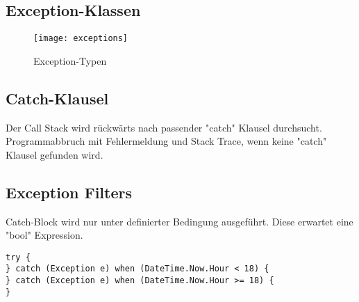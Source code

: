 \subsection{Exception-Klassen}
\begin{figure}[h!]
	\centering
	\texttt{[image: exceptions]}
  \caption{Exception-Typen}
\end{figure}

\subsection{Catch-Klausel}
Der Call Stack wird rückwärts nach passender "catch" Klausel durchsucht. Programmabbruch mit Fehlermeldung und Stack Trace, wenn keine "catch" Klausel gefunden wird.

\subsection{Exception Filters}
Catch-Block wird nur unter definierter Bedingung ausgeführt. Diese erwartet eine "bool" Expression.

\begin{lstlisting}
try {
} catch (Exception e) when (DateTime.Now.Hour < 18) {
} catch (Exception e) when (DateTime.Now.Hour >= 18) {
}
\end{lstlisting}

\pagebreak